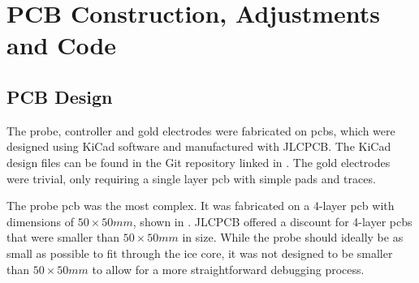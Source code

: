 
\chapter{PCB Construction, Adjustments and Code}\label{ch:implementation}

\section{PCB Design}

The probe, controller and gold electrodes were fabricated on \glspl{pcb}, which were designed using KiCad software and manufactured with JLCPCB.
The KiCad design files can be found in the Git repository linked in . 
The gold electrodes were trivial, only requiring a single layer \gls{pcb} with simple pads and traces.

The probe \gls{pcb} was the most complex.
It was fabricated on a 4-layer \gls{pcb} with dimensions of $50\times 50mm$, shown in .
JLCPCB offered a discount for 4-layer \glspl{pcb} that were smaller than $50\times 50mm$ in size.
While the probe should ideally be as small as possible to fit through the ice core, it was not designed to be smaller than $50\times 50mm$ to allow for a more straightforward debugging process.

